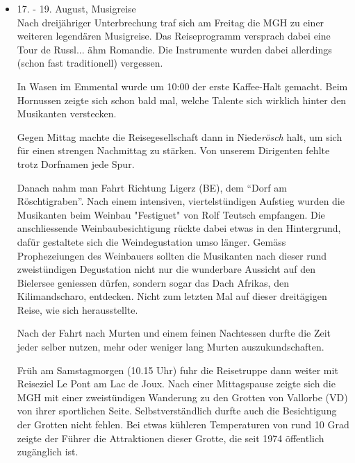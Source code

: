 \begin{history}
\begin{itemize}
        \item 17. - 19. August, Musigreise\\
              Nach dreijähriger Unterbrechung traf sich am Freitag die MGH zu einer
              weiteren legendären Musigreise. Das Reiseprogramm versprach dabei eine
              Tour de Russl... ähm Romandie. Die Instrumente wurden dabei allerdings
              (schon fast traditionell) vergessen.

              In Wasen im Emmental wurde um 10:00 der erste Kaffee-Halt gemacht. Beim
              Hornussen zeigte sich schon bald mal, welche Talente sich wirklich
              hinter den Musikanten verstecken.

              Gegen Mittag machte die Reisegesellschaft dann in Niede\emph{rösch}
              halt, um sich für einen strengen Nachmittag zu stärken. Von unserem
              Dirigenten fehlte trotz Dorfnamen jede Spur.

              Danach nahm man Fahrt Richtung Ligerz (BE), dem \enquote{Dorf am
                  Röschtigraben}. Nach einem intensiven, viertelstündigen Aufstieg
              wurden die Musikanten beim Weinbau "Festiguet" von Rolf Teutsch
              empfangen. Die anschliessende Weinbaubesichtigung rückte dabei etwas
              in den Hintergrund, dafür gestaltete sich die Weindegustation umso
              länger. Gemäss Prophezeiungen des Weinbauers sollten die Musikanten
              nach dieser rund zweistündigen Degustation nicht nur die wunderbare
              Aussicht auf den Bielersee geniessen dürfen, sondern sogar das Dach
              Afrikas, den Kilimandscharo, entdecken. Nicht zum letzten Mal auf
              dieser dreitägigen Reise, wie sich herausstellte.

              Nach der Fahrt nach Murten und einem feinen Nachtessen durfte die Zeit
              jeder selber nutzen, mehr oder weniger lang Murten auszukundschaften.

              Früh am Samstagmorgen (10.15 Uhr) fuhr die Reisetruppe dann weiter mit
              Reiseziel Le Pont am Lac de Joux. Nach einer Mittagspause zeigte sich
              die MGH mit einer zweistündigen Wanderung zu den Grotten von Vallorbe
              (VD) von ihrer sportlichen Seite. Selbstverständlich durfte auch die
              Besichtigung der Grotten nicht fehlen. Bei etwas kühleren Temperaturen
              von rund 10 Grad zeigte der Führer die Attraktionen dieser Grotte, die
              seit 1974 öffentlich zugänglich ist.


\end{itemize}
\end{history}
